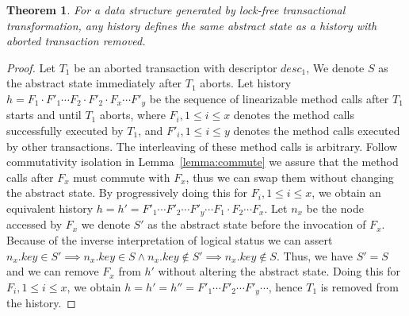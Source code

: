 \documentclass[]{sig-alternate-05-2015}
\newtheorem{theorem}{Theorem}
\begin{document}
\begin{theorem}
    For a data structure generated by lock-free transactional transformation, any history defines the same abstract state as a history with aborted transaction removed.
\end{theorem}
\begin{proof}
    Let $T_1$ be an aborted transaction with descriptor $desc_1$, 
    We denote $S$ as the abstract state immediately after $T_1$ aborts.
    Let history $h = F_1 \cdot F'_1 \cdots F_2 \cdot F'_2 \cdot F_x \cdots F'_y$ be the sequence of linearizable method calls after $T_1$ starts and until $T_1$ aborts, where $F_i, 1 \le i \le x$ denotes the method calls successfully executed by $T_1$, and $F'_i, 1 \le i \le y$ denotes the method calls executed by other transactions.
    The interleaving of these method calls is arbitrary.
    Follow commutativity isolation in Lemma~\ref{lemma:commute} we assure that the method calls after $F_x$ must commute with $F_x$, thus we can swap them without changing the abstract state.
    By progressively doing this for $F_i, 1 \le i \le x$, we obtain an equivalent history $h = h' = F'_1 \cdots F'_2 \cdots F'_y \cdots F_1 \cdot F_2 \cdots F_x$.
    Let $n_x$ be the node accessed by $F_x$
    we denote $S'$ as the abstract state before the invocation of $F_x$. 
    Because of the inverse interpretation of logical status we can assert $n_x.key \in S' \implies n_x.key \in S \land n_x.key \notin S' \implies n_x.key \notin S$.
    Thus, we have $S' = S$ and we can remove $F_x$ from $h'$ without altering the abstract state.
    Doing this for $F_i, 1 \le i \le x$, we obtain $h = h' = h'' =F'_1 \cdots F'_2 \cdots F'_y \cdots$, hence $T_1$ is removed from the history.
\end{proof}
\end{document}
